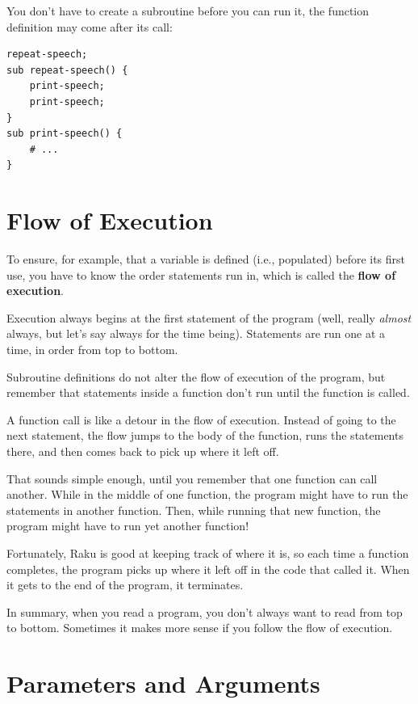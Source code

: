 You don't have to create a subroutine before you can run it, 
the function definition may come after its call:
\begin{verbatim}
repeat-speech;
sub repeat-speech() {
    print-speech;
    print-speech;
}
sub print-speech() {
    # ...
}
\end{verbatim}


\section{Flow of Execution}

To ensure, for example, that a variable is defined (i.e., populated) 
before its first use, you have to know the order statements run in, 
which is called the {\bf flow of execution}.

Execution always begins at the first statement of the program 
(well, really \emph{almost} always, but let's say always 
for the time being). Statements are run one at a time, 
in order from top to bottom.

Subroutine definitions do not alter the flow of execution of the
program, but remember that statements inside a function don't
run until the function is called.

A function call is like a detour in the flow of execution. Instead of
going to the next statement, the flow jumps to the body of
the function, runs the statements there, and then comes back
to pick up where it left off.

That sounds simple enough, until you remember that one function can
call another.  While in the middle of one function, the program might
have to run the statements in another function.  Then, while
running that new function, the program might have to run yet
another function!

Fortunately, Raku is good at keeping track of where it is, so each
time a function completes, the program picks up where it left off in
the code that called it.  When it gets to the end of the program,
it terminates.

In summary, when you read a program, you
don't always want to read from top to bottom.  Sometimes it makes
more sense if you follow the flow of execution.


\section{Parameters and Arguments}
\label{parameters}

